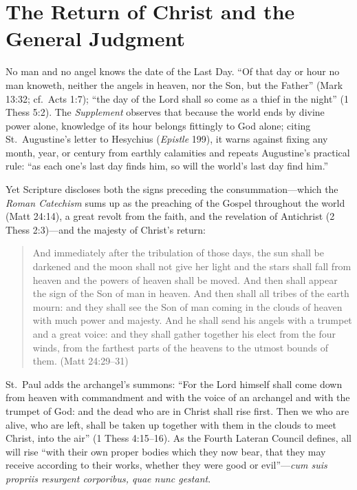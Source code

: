 \section{The Return of Christ and the General Judgment}

No man and no angel knows the date of the Last Day. ``Of that day or hour no man knoweth, neither the angels in heaven, nor the Son, but the Father'' (Mark 13:32; cf.\ Acts 1:7); ``the day of the Lord shall so come as a thief in the night'' (1 Thess 5:2). The \textit{Supplement} observes that because the world ends by divine power alone, knowledge of its hour belongs fittingly to God alone; citing St.\ Augustine's letter to Hesychius (\textit{Epistle} 199), it warns against fixing any month, year, or century from earthly calamities and repeats Augustine's practical rule: ``as each one's last day finds him, so will the world's last day find him.''

Yet Scripture discloses both the signs preceding the consummation---which the \textit{Roman Catechism} sums up as the preaching of the Gospel throughout the world (Matt 24:14), a great revolt from the faith, and the revelation of Antichrist (2 Thess 2:3)---and the majesty of Christ's return:

\begin{quote}
And immediately after the tribulation of those days, the sun shall be darkened and the moon shall not give her light and the stars shall fall from heaven and the powers of heaven shall be moved. And then shall appear the sign of the Son of man in heaven. And then shall all tribes of the earth mourn: and they shall see the Son of man coming in the clouds of heaven with much power and majesty. And he shall send his angels with a trumpet and a great voice: and they shall gather together his elect from the four winds, from the farthest parts of the heavens to the utmost bounds of them. (Matt 24:29--31)
\end{quote}

St.\ Paul adds the archangel's summons: ``For the Lord himself shall come down from heaven with commandment and with the voice of an archangel and with the trumpet of God: and the dead who are in Christ shall rise first. Then we who are alive, who are left, shall be taken up together with them in the clouds to meet Christ, into the air'' (1 Thess 4:15--16). As the Fourth Lateran Council defines, all will rise ``with their own proper bodies which they now bear, that they may receive according to their works, whether they were good or evil''---\textit{cum suis propriis resurgent corporibus, quae nunc gestant}.


